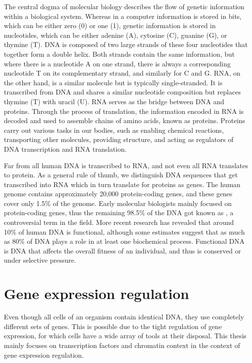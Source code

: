 The central dogma of molecular biology describes the flow of genetic information within a biological system. Whereas in a computer information is stored in bits, which can be either zero (0) or one (1), genetic information is stored in nucleotides, which can be either adenine (A), cytosine (C), guanine (G), or thymine (T). DNA is composed of two large strands of these four nucleotides that together form a double helix. Both strands contain the same information, but where there is a nucleotide A on one strand, there is always a corresponding nucleotide T on its complementary strand, and similarly for C and G. RNA, on the other hand, is a similar molecule but is typically single-stranded. It is transcribed from DNA and shares a similar nucleotide composition but replaces thymine (T) with uracil (U). RNA serves as the bridge between DNA and proteins. Through the process of translation, the information encoded in RNA is decoded and used to assemble chains of amino acids, known as proteins. Proteins carry out various tasks in our bodies, such as enabling chemical reactions, transporting other molecules, providing structure, and acting as regulators of DNA transcription and RNA translation.

Far from all human DNA is transcribed to RNA, and not even all RNA translates to protein. As a general rule of thumb, we distinguish DNA sequences that get transcribed into RNA which in turn translate for proteins as genes. The human genome contains approximately 20,000 protein-coding genes, and these genes cover only 1.5\% of the genome\cite{Piovesan2019}. Early molecular biologists mainly focused on protein-coding genes, thus the remaining 98.5\% of the DNA got known as , a controversial term in the field\cite{Graur2013}. More recent research has revealed that around 10\% of human DNA is functional\cite{Graur2013}, although some estimates suggest that as much as 80\% of DNA plays a role in at least one biochemical process\cite{encode2012}. Functional DNA is DNA that affects the overall fitness of an individual, and thus is conserved or under selective pressure\cite{Kellis2014}.

\section{Gene expression regulation}

Even though all cells of an organism contain identical DNA, they use completely different sets of genes. This is possible due to the tight regulation of gene expression, for which cells have a wide array of tools at their disposal. This thesis mainly focuses on transcription factors and chromatin context in the context of gene expression regulation.

